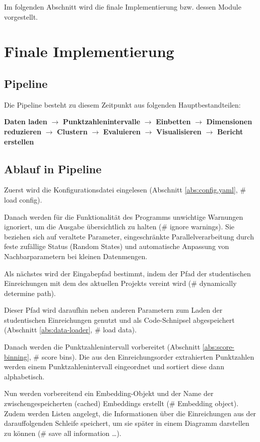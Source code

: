 Im folgenden Abschnitt wird die finale Implementierung bzw. dessen Module vorgestellt.

\section{Finale Implementierung}
\subsection{Pipeline}
Die Pipeline besteht zu diesem Zeitpunkt aus folgenden Hauptbestandteilen:

\textbf{Daten laden} $\rightarrow$ \textbf{Punktzahlenintervalle} $\rightarrow$ \textbf{Einbetten} $\rightarrow$ \textbf{Dimensionen reduzieren} $\rightarrow$ \textbf{Clustern} $\rightarrow$ \textbf{Evaluieren} $\rightarrow$ \textbf{Visualisieren} $\rightarrow$ \textbf{Bericht erstellen}

\subsection{Ablauf in Pipeline}
Zuerst wird die Konfigurationsdatei eingelesen (Abschnitt \ref{abs:config.yaml}, \# load config).

Danach werden für die Funktionalität des Programms unwichtige Warnungen ignoriert, um die Ausgabe übersichtlich zu halten (\# ignore warnings). Sie beziehen sich auf veraltete Parameter, eingeschränkte Parallelverarbeitung durch feste zufällige Status (Random States) und automatische Anpassung von Nachbarparametern bei kleinen Datenmengen.

Als nächstes wird der Eingabepfad bestimmt, indem der Pfad der studentischen Einreichungen mit dem des aktuellen Projekts vereint wird (\# dynamically determine path).

Dieser Pfad wird daraufhin neben anderen Parametern zum Laden der studentischen Einreichungen genutzt und als Code-Schnipsel abgespeichert (Abschnitt \ref{abs:data-loader}, \# load data).

Danach werden die Punktzahlenintervall vorbereitet (Abschnitt \ref{abs:score-binning}, \# score bins). Die aus den Einreichungsorder extrahierten Punktzahlen werden einem Punktzahlenintervall eingeordnet und sortiert diese dann alphabetisch.

Nun werden vorbereitend ein Embedding-Objekt und der Name der zwischengespeicherten (cached) Embeddings erstellt (\# Embedding object). Zudem werden Listen angelegt, die Informationen über die Einreichungen aus der darauffolgenden Schleife speichert, um sie später in einem Diagramm darstellen zu können (\# save all information \dots).

